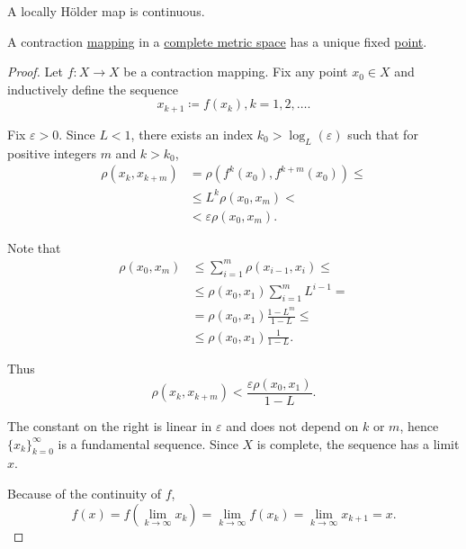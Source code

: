\begin{corollary}\label{thm:locally_holder_map_is_continuous}
  A locally H\"older map is continuous.
\end{corollary}

\begin{theorem}\label{thm:banach_fixed_point_theorem}\cite[exercise 4.3.J]{Engelking1989}
  A contraction \hyperref[def:lipschitz_continuity/contraction]{mapping} in a \hyperref[def:complete_metric_space]{complete metric space} has a unique fixed \hyperref[def:fixed_point]{point}.
\end{theorem}
\begin{proof}
  Let \( f: X \to X \) be a contraction mapping. Fix any point \( x_0 \in X \) and inductively define the sequence
  \begin{equation*}
    x_{k+1} \coloneqq f(x_k), k = 1, 2, \ldots.
  \end{equation*}

  Fix \( \varepsilon > 0 \). Since \( L < 1 \), there exists an index \( k_0 > \log_L(\varepsilon) \) such that for positive integers \( m \) and \( k > k_0 \),
  \begin{align*}
    \rho(x_k, x_{k+m})
    &=
    \rho(f^k(x_0), f^{k+m}(x_0))
    \leq \\ &\leq
    L^k \rho(x_0, x_m)
    < \\ &<
    \varepsilon \rho(x_0, x_m).
  \end{align*}

  Note that
  \begin{align*}
    \rho(x_0, x_m)
    &\leq
    \sum_{i=1}^m \rho(x_{i-1}, x_i)
    \leq \\ &\leq
    \rho(x_0, x_1) \sum_{i=1}^m L^{i-1}
    = \\ &=
    \rho(x_0, x_1) \frac {1 - L^m} {1 - L}
    \leq \\ &\leq
    \rho(x_0, x_1) \frac 1 {1 - L}.
  \end{align*}

  Thus
  \begin{equation*}
    \rho(x_k, x_{k+m}) < \frac {\varepsilon \rho(x_0, x_1)} {1 - L}.
  \end{equation*}

  The constant on the right is linear in \( \varepsilon \) and does not depend on \( k \) or \( m \), hence \( \{ x_k \}_{k=0}^\infty \) is a fundamental sequence. Since \( X \) is complete, the sequence has a limit \( x \).

  Because of the continuity of \( f \),
  \begin{equation*}
    f(x) = f(\lim_{k \to \infty} x_k) = \lim_{k \to \infty} f(x_k) = \lim_{k \to \infty} x_{k+1} = x.
  \end{equation*}
\end{proof}
